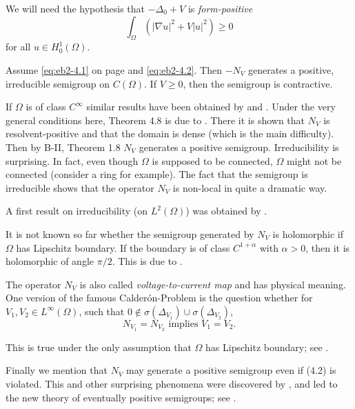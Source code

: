 We will need the hypothesis that $-\Delta_0 + V$ is \emph{form-positive} \ie
\begin{equation}\label{eq:eb2-4.2}
	\int_\Omega (|\nabla u|^2 + V|u|^2) \geq 0
\end{equation}
for all $u \in H^1_0(\Omega)$.
\begin{theorem}
Assume \eqref{eq:eb2-4.1} on page \pageref{eq:eb2-4.1} and \eqref{eq:eb2-4.2}. 
Then $- N_{V}$ generates a positive, irreducible semigroup on $C(\Omega)$. If $V \geq 0$, then the semigroup is contractive.
\end{theorem}
If $\Omega$ is of class $C^\infty$ similar results have been obtained by \citet{Es94} and \citet{En03}. 
Under the very general conditions here, Theorem 4.8 is due to \citet{AtE20}. 
There it is shown that $N_{V}$ is resolvent-positive and that the domain is dense (which is the main difficulty). 
Then by B-II, Theorem 1.8 $N_{V}$ generates a positive semigroup. 
Irreducibility is surprising. 
In fact, even though $\Omega$ is supposed to be connected, $\Omega$ might not be connected (consider a ring for example). 
The fact that the semigroup is irreducible shows that the operator $N_{V}$ is non-local in quite a dramatic way.

A first result on irreducibility (on $L^2(\Omega)$) was obtained by \citet{AM12}.

It is not known so far whether the semigroup generated by $N_{V}$ is holomorphic if $\Omega$ has Lipschitz boundary. 
If the boundary is of class $C^{1+\alpha}$ with $\alpha > 0$, then it is holomorphic of angle $\pi/2$. 
This is due to \citet{tEO19}.

The operator $N_{V}$ is also called \emph{voltage-to-current map} and has physical meaning. 
One version of the famous Calderón-Problem is the question whether for $V_1, V_2 \in L^\infty(\Omega)$, such that $0 \notin \sigma(\Delta_{V_1}) \cup \sigma(\Delta_{V_2})$,
\[N_{V_1} = N_{V_2} \text{ implies } V_1 = V_2.\]

This is true under the only assumption that $\Omega$ has Lipschitz boundary; see \citet[Theorem 1.1]{KU14}.

Finally we mention that $N_{V}$ may generate a positive semigroup even if (4.2) is violated. 
This and other surprising phenomena were discovered by  \citet{Da14}, and led to the new theory of eventually positive semigroups; see \eg \citet{DEK16}.

